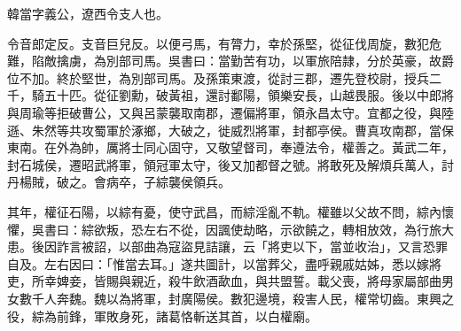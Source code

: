 
\begin{pinyinscope}
韓當字義公，遼西令支人也。

令音郎定反。支音巨兒反。以便弓馬，有膂力，幸於孫堅，從征伐周旋，數犯危難，陷敵擒虜，為別部司馬。吳書曰：當勤苦有功，以軍旅陪隷，分於英豪，故爵位不加。終於堅世，為別部司馬。及孫策東渡，從討三郡，遷先登校尉，授兵二千，騎五十匹。從征劉勳，破黃祖，還討鄱陽，領樂安長，山越畏服。後以中郎將與周瑜等拒破曹公，又與呂蒙襲取南郡，遷偏將軍，領永昌太守。宜都之役，與陸遜、朱然等共攻蜀軍於涿鄉，大破之，徙威烈將軍，封都亭侯。曹真攻南郡，當保東南。在外為帥，厲將士同心固守，又敬望督司，奉遵法令，權善之。黃武二年，封石城侯，遷昭武將軍，領冠軍太守，後又加都督之號。將敢死及解煩兵萬人，討丹楊賊，破之。會病卒，子綜襲侯領兵。

其年，權征石陽，以綜有憂，使守武昌，而綜淫亂不軌。權雖以父故不問，綜內懷懼，吳書曰：綜欲叛，恐左右不從，因諷使劫略，示欲饒之，轉相放效，為行旅大患。後因詐言被詔，以部曲為寇盜見詰讓，云「將吏以下，當並收治」，又言恐罪自及。左右因曰：「惟當去耳。」遂共圖計，以當葬父，盡呼親戚姑姊，悉以嫁將吏，所幸婢妾，皆賜與親近，殺牛飲酒歃血，與共盟誓。載父喪，將母家屬部曲男女數千人奔魏。魏以為將軍，封廣陽侯。數犯邊境，殺害人民，權常切齒。東興之役，綜為前鋒，軍敗身死，諸葛恪斬送其首，以白權廟。


\end{pinyinscope}